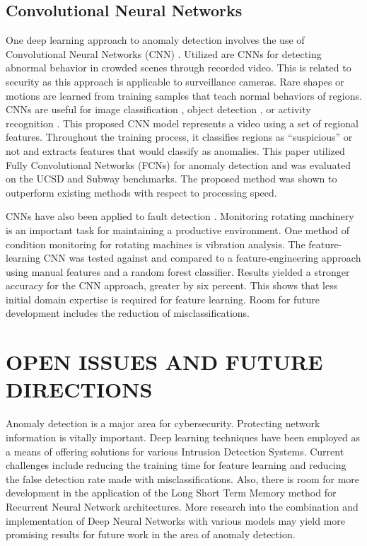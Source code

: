 \documentclass[letterpaper, 10 pt, conference]{ieeeconf}
\begin{document}
\subsection{Convolutional Neural Networks}
One deep learning approach to anomaly detection involves the use of Convolutional Neural Networks (CNN) \cite{c8}. Utilized are CNNs for detecting abnormal behavior in crowded scenes through recorded video. This is related to security as this approach is applicable to surveillance cameras. Rare shapes or motions are learned from training samples that teach normal behaviors of regions. CNNs are useful for image classification \cite{c13}, object detection \cite{c14}, or activity recognition \cite{c15, c8}. This proposed CNN model represents a video using a set of regional features. Throughout the training process, it classifies regions as ``suspicious'' or not and extracts features that would classify as anomalies. This paper utilized Fully Convolutional Networks (FCNs) for anomaly detection and was evaluated on the UCSD and Subway benchmarks. The proposed method was shown to outperform existing methods with respect to processing speed.

CNNs have also been applied to fault detection \cite{c9}. Monitoring rotating machinery is an important task for maintaining a productive environment. One method of condition monitoring for rotating machines is vibration analysis. The feature-learning CNN was tested against and compared to a feature-engineering approach using manual features and a random forest classifier. Results yielded a stronger accuracy for the CNN approach, greater by six percent. This shows that less initial domain expertise is required for feature learning. Room for future development includes the reduction of misclassifications.

\hfill
\section{OPEN ISSUES AND FUTURE DIRECTIONS}
Anomaly detection is a major area for cybersecurity. Protecting network information is vitally important. Deep learning techniques have been employed as a means of offering solutions for various Intrusion Detection Systems. Current challenges include reducing the training time for feature learning and reducing the false detection rate made with misclassifications. Also, there is room for more development in the application of the Long Short Term Memory method for Recurrent Neural Network architectures. More research into the combination and implementation of Deep Neural Networks with various models may yield more promising results for future work in the area of anomaly detection. 
\end{document}
